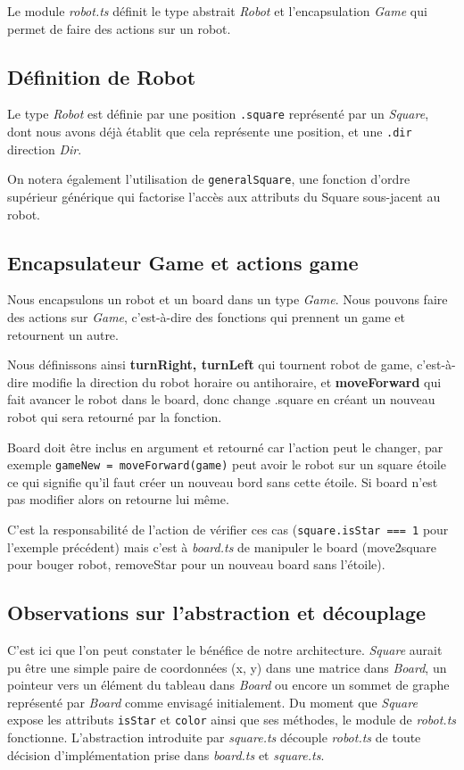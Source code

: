 Le module \textit{robot.ts} définit le type abstrait \textit{Robot} et l'encapsulation \textit{Game} qui permet de faire des actions sur un robot.

\subsection{Définition de Robot}

Le type \textit{Robot} est définie par une position \texttt{.square} représenté par un \textit{Square}, dont nous avons déjà établit que cela représente une position, et une \texttt{.dir} direction \textit{Dir}.

On notera également l'utilisation de \texttt{generalSquare}, une fonction d'ordre supérieur générique qui factorise l'accès aux attributs du Square sous-jacent au robot.

\subsection{Encapsulateur Game et actions game}

Nous encapsulons un robot et un board dans un type \textit{Game}. Nous pouvons faire des actions sur \textit{Game}, c’est-à-dire des fonctions qui prennent un game et retournent un autre.

 Nous définissons ainsi \textbf{turnRight, turnLeft} qui tournent robot de game, c’est-à-dire modifie la direction du robot horaire ou antihoraire, et \textbf{moveForward} qui fait avancer le robot dans le board, donc change .square en créant un nouveau robot qui sera retourné par la fonction.

Board doit être inclus en argument et retourné car l’action peut le changer, par exemple \texttt{gameNew = moveForward(game)} peut avoir le robot sur un square étoile ce qui signifie qu’il faut créer un nouveau bord sans cette étoile. Si board n'est pas modifier alors on retourne lui même.

C’est la responsabilité de l’action de vérifier ces cas (\texttt{square.isStar === 1} pour l'exemple précédent) mais c’est à \textit{board.ts} de manipuler le board (move2square pour bouger robot, removeStar pour un nouveau board sans l’étoile). 


\subsection{Observations sur l’abstraction et découplage}

C'est ici que l'on peut constater le bénéfice de notre architecture. \textit{Square} aurait pu être une simple paire de coordonnées (x, y) dans une matrice dans \textit{Board}, un pointeur vers un élément du tableau dans \textit{Board} ou encore un sommet de graphe représenté par \textit{Board} comme envisagé initialement. Du moment que \textit{Square} expose les attributs \texttt{isStar} et \texttt{color} ainsi que ses méthodes, le module de \textit{robot.ts} fonctionne. L'abstraction introduite par \textit{square.ts} découple \textit{robot.ts} de toute décision d'implémentation prise dans \textit{board.ts} et \textit{square.ts}.


